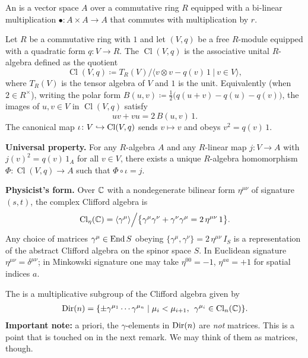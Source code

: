 \documentclass[11pt]{article}
\begin{document}
\begin{definition}
    An  is a vector space $A$ over a commutative ring $R$
    equipped with a bi-linear multiplication $\bullet \colon A \times A \to A$
    that commutes with multiplication by $r$.
\end{definition}

\begin{definition}
    Let $R$ be a commutative ring with $1$ and let $(V, q)$ be a free $R$-module
    equipped with a quadratic form $q \colon V \to R$. The 
    $\operatorname{Cl}(V, q)$ is the associative unital $R$-algebra defined as the
    quotient
    \[
        \operatorname{Cl}(V, q) \coloneqq T_R(V)\Big/ \big\langle v \otimes v - q(v)\,1 \: \big| \: v \in V \big\rangle,
    \]
    where $T_R(V)$ is the tensor algebra of $V$ and $1$ is the unit. Equivalently
    (when $2 \in R^\times$), writing the polar form $B(u, v) \coloneqq \tfrac{1}{2}\big(q(u+v)-q(u)-q(v)\big)$,
    the images of $u, v \in V$ in $\operatorname{Cl}(V, q)$ satisfy
    \[
        uv + vu = 2\,B(u, v)\,1.
    \]
    The canonical map $\iota \colon V \hookrightarrow \operatorname{Cl}(V, q)$ sends $v \mapsto v$ and
    obeys $v^2 = q(v)\,1$.

    \textbf{Universal property.} For any $R$-algebra $A$ and any $R$-linear map
    $j \colon V \to A$ with $j(v)^2 = q(v)\,1_A$ for all $v \in V$, there exists a unique
    $R$-algebra homomorphism $\Phi \colon \operatorname{Cl}(V, q) \to A$ such that
    $\Phi \circ \iota = j$.

    \textbf{Physicist's form.} Over $\mathbb{C}$ with a nondegenerate bilinear form
    $\eta^{\mu \nu}$ of signature $(s, t)$, the complex Clifford algebra is
    \[
        \operatorname{Cl}_{\eta}(\mathbb{C}) = \langle \gamma^\mu \rangle \Big/ \big\{ \gamma^\mu \gamma^\nu + \gamma^\nu \gamma^\mu = 2 \, \eta^{\mu \nu} \, 1 \big\}.
    \]
    Any choice of matrices $\gamma^\mu \in \operatorname{End}{S}$ obeying $\{ \gamma^\mu, \gamma^\nu \} = 2 \, \eta^{\mu \nu} \, I_S$
    is a representation of the abstract Clifford algebra on the spinor space $S$.
    In Euclidean signature $\eta^{\mu \nu} = \delta^{\mu \nu}$; in Minkowski signature one may
    take $\eta^{00} = -1$, $\eta^{aa} = +1$ for spatial indices $a$.
\end{definition}

\begin{definition}
    The  is a multiplicative subgroup of the Clifford algebra
    given by 
    \begin{align*}
        {\rm Dir}(n) = \{ \pm \gamma^{\mu_1} \cdots \gamma^{\mu_n} \mid \mu_i < \mu_{i + 1}, \: \: \gamma^{\mu_i} \in \operatorname{Cl}_n(\mathbb{C}) \}.
    \end{align*}
    \textbf{Important note:} a priori, the $\gamma$-elements in ${\rm Dir}(n)$
    are \emph{not} matrices. This is a point that is touched on in the
    next remark. We may think of them as matrices, though.
\end{definition}
\end{document}
